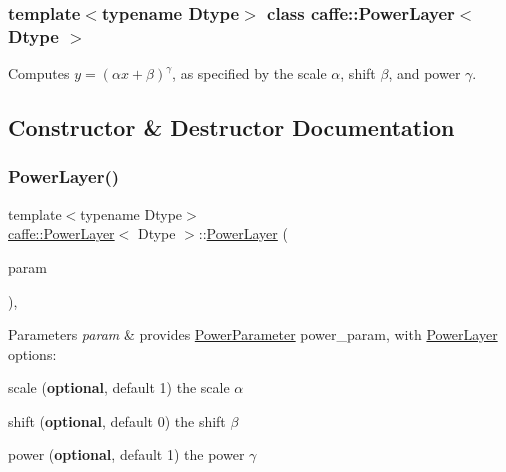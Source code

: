 \subsubsection*{template$<$typename Dtype$>$\newline
class caffe\+::\+Power\+Layer$<$ Dtype $>$}

Computes $ y = (\alpha x + \beta) ^ \gamma $, as specified by the scale $ \alpha $, shift $ \beta $, and power $ \gamma $. 

\subsection{Constructor \& Destructor Documentation}
\mbox{\label{classcaffe_1_1_power_layer_ab008c03c36436e1a0dac0fe1faa53c6d}} 
\subsubsection{\texorpdfstring{Power\+Layer()}{PowerLayer()}\hspace{0.1cm}{\footnotesize\ttfamily [1/2]}}
{\footnotesize\ttfamily template$<$typename Dtype$>$ \\
\mbox{\hyperlink{classcaffe_1_1_power_layer}{caffe\+::\+Power\+Layer}}$<$ Dtype $>$\+::\mbox{\hyperlink{classcaffe_1_1_power_layer}{Power\+Layer}} (\begin{DoxyParamCaption}\item[{const \mbox{\hyperlink{classcaffe_1_1_layer_parameter}{Layer\+Parameter}} \&}]{param }\end{DoxyParamCaption})\hspace{0.3cm}{\ttfamily [inline]}, {\ttfamily [explicit]}}


\begin{DoxyParams}{Parameters}
{\em param} & provides \mbox{\hyperlink{classcaffe_1_1_power_parameter}{Power\+Parameter}} power\+\_\+param, with \mbox{\hyperlink{classcaffe_1_1_power_layer}{Power\+Layer}} options\+:
\begin{DoxyItemize}
\item scale ({\bfseries optional}, default 1) the scale $ \alpha $
\item shift ({\bfseries optional}, default 0) the shift $ \beta $
\item power ({\bfseries optional}, default 1) the power $ \gamma $ 
\end{DoxyItemize}\\
\hline
\end{DoxyParams}
\mbox{\label{classcaffe_1_1_power_layer_ab008c03c36436e1a0dac0fe1faa53c6d}} 

